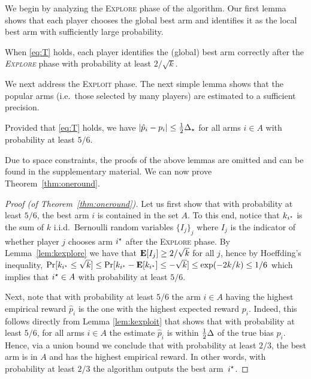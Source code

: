 \documentclass{article} %
\newcommand{\phat}{\hat{p}}
\newcommand{\Delst}{\Del_{\st}}
\begin{document}
We begin by analyzing the \textsc{Explore} phase of the algorithm. Our first lemma shows that each player chooses the global best arm and identifies it as the local best arm with sufficiently large probability.


\begin{lemma} \label{lem:kexplore}
When \eqref{eq:T} holds, each player identifies the (global) best arm correctly after the \emph{\textsc{Explore}} phase with probability at least $2/\sqrt{k}$.
\end{lemma}

We next address the \textsc{Exploit} phase. The next simple lemma shows that the
popular arms (i.e.~those selected by many players) are estimated to a sufficient
precision.  


\begin{lemma} \label{lem:kexploit}
Provided that \eqref{eq:T} holds, we have $\abs{\phat_i - p_i} \le \tfrac{1}{2} \Delst$ for all arms $i \in A$ with probability at least $5/6$. 
\end{lemma}



Due to space constraints, the proofs of the above lemmas are omitted and can be found in the supplementary material.
We can now prove Theorem~\ref{thm:oneround}.

\begin{proof}[Proof (of Theorem~\ref{thm:oneround})]
Let us first show that with probability at least $5/6$, the best arm $i$ is contained in the set $A$.
To this end, notice that $k_{i^\star}$ is the sum of $k$ i.i.d.~Bernoulli random variables $\{I_j\}_{j}$ where $I_j$ is the indicator of whether player $j$ chooses arm $i^\star$ after the \textsc{Explore} phase. By Lemma~\ref{lem:kexplore} we have that $\mathbf{E}[I_j] \geq 2/\sqrt{k}$ for all $j$, hence by Hoeffding's inequality,
$
	\Pr[ k_{i^\star} \le \sqrt{k} ] 
	\le \Pr[ k_{i^\star} - \mathbf{E}[k_{i^\star}] \le -\sqrt{k} ]
	\le \exp(-2k/k) 
	\le 1/6
$
which implies that $i^\star \in A$ with probability at least $5/6$.


Next, note that with probability at least $5/6$ the arm $i \in A$ having the highest empirical reward $\phat_i$ is the one with the highest expected reward $p_i$.
Indeed, this follows directly from Lemma \ref{lem:kexploit} that shows that with probability at least $5/6$, for all arms $i \in A$ the estimate $\phat_i$ is within $\frac{1}{2}\Delta$ of the true bias $p_i$.
Hence, via a union bound we conclude that with probability at least $2/3$, the best arm is in $A$ and has the highest empirical reward. 
In other words, with probability at least $2/3$ the algorithm outputs the best arm~$i^\star$.
\end{proof}
\end{document}
